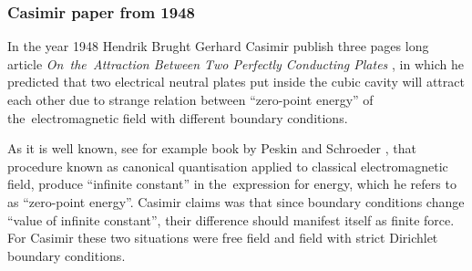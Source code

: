 \documentclass[10pt,t]{beamer}
\begin{document}
\begin{frame}
  \frametitle{Casimir paper from 1948}


  In the year 1948 Hendrik Brught Gerhard Casimir publish three pages
  long article \textit{On~the~Attraction Between Two Perfectly Conducting
    Plates} \parencite{Casimir-On-the-Attraction-Between-ETC-Pub-1948}, in
  which he predicted that two electrical neutral plates put inside the cubic
  cavity will attract each other due to strange relation between ``zero-point
  energy'' of the~electromagnetic field with different boundary conditions.

  As it is well known, see for example book by Peskin and Schroeder
  \parencite{Peskin-Schroeder-An-Introduction-to-Quantum-Field-Theory-Pub-1995},
  that procedure known as canonical quantisation applied to classical
  electromagnetic field, produce ``infinite constant'' in the~expression
  for energy, which he refers to as ``zero-point energy''. Casimir claims
  was that since boundary conditions change ``value of infinite constant'',
  their difference should manifest itself as finite force. For Casimir
  these two situations were free field and field with strict Dirichlet
  boundary conditions.


\end{frame}
\end{document}
